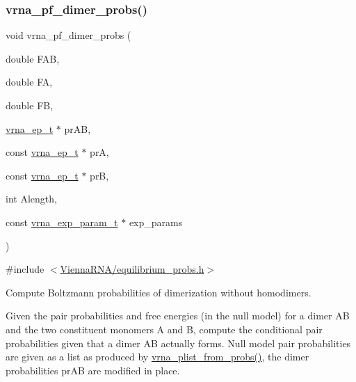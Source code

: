\subsubsection{\texorpdfstring{vrna\_pf\_dimer\_probs()}{vrna\_pf\_dimer\_probs()}}
{\footnotesize\ttfamily void vrna\+\_\+pf\+\_\+dimer\+\_\+probs (\begin{DoxyParamCaption}\item[{double}]{F\+AB,  }\item[{double}]{FA,  }\item[{double}]{FB,  }\item[{\mbox{\hyperlink{group__struct__utils__plist_gab9ac98ab55ded9fb90043b024b915aca}{vrna\+\_\+ep\+\_\+t}} $\ast$}]{pr\+AB,  }\item[{const \mbox{\hyperlink{group__struct__utils__plist_gab9ac98ab55ded9fb90043b024b915aca}{vrna\+\_\+ep\+\_\+t}} $\ast$}]{prA,  }\item[{const \mbox{\hyperlink{group__struct__utils__plist_gab9ac98ab55ded9fb90043b024b915aca}{vrna\+\_\+ep\+\_\+t}} $\ast$}]{prB,  }\item[{int}]{Alength,  }\item[{const \mbox{\hyperlink{group__energy__parameters_ga01d8b92fe734df8d79a6169482c7d8d8}{vrna\+\_\+exp\+\_\+param\+\_\+t}} $\ast$}]{exp\+\_\+params }\end{DoxyParamCaption})}



{\ttfamily \#include $<$\mbox{\hyperlink{equilibrium__probs_8h}{Vienna\+R\+N\+A/equilibrium\+\_\+probs.\+h}}$>$}



Compute Boltzmann probabilities of dimerization without homodimers. 

Given the pair probabilities and free energies (in the null model) for a dimer AB and the two constituent monomers A and B, compute the conditional pair probabilities given that a dimer AB actually forms. Null model pair probabilities are given as a list as produced by \mbox{\hyperlink{group__part__func__global_ga94f6efc0b8d8712b023452794a0a5bd2}{vrna\+\_\+plist\+\_\+from\+\_\+probs()}}, the dimer probabilities \textquotesingle{}pr\+AB\textquotesingle{} are modified in place.


